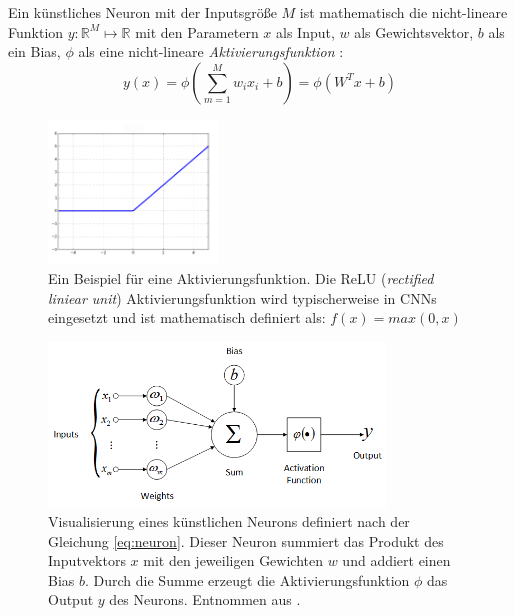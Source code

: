 Ein künstliches Neuron mit der Inputsgröße $M$ ist mathematisch die nicht-lineare Funktion $y : \mathbb{R}^M \mapsto \mathbb{R}$ mit den Parametern $x$ als Input, $w$ als Gewichtsvektor, $b$ als ein Bias, $\phi$ als eine nicht-lineare \textit{Aktivierungsfunktion} \cite{CS231nConvolutionalNeural}:
\begin{equation}
	\label{eq:neuron}
	y(x)=\phi\left(\sum_{m=1}^{M} w_{i} x_{i} + b\right) = \phi(W^Tx+b)
\end{equation}

\begin{figure}[h]
	\centering
	\includegraphics[width=0.4\textwidth]{images/ReLU.png}
	\caption{Ein Beispiel für eine Aktivierungsfunktion. Die ReLU (\textit{rectified liniear unit}) Aktivierungsfunktion wird typischerweise in CNNs eingesetzt und ist mathematisch definiert als: $f(x) = max(0,x)$ \cite{Goodfellow-et-al-2016} }
	\label{fig:relu}
\end{figure}

\begin{figure}[h]
	\centering
	\includegraphics[width=0.8\textwidth]{images/neuron.png}
	\caption{Visualisierung eines künstlichen Neurons definiert nach der Gleichung \ref{eq:neuron}. Dieser Neuron summiert das Produkt des Inputvektors $x$  mit den jeweiligen Gewichten $w$ und addiert einen Bias $b$. Durch die Summe erzeugt die Aktivierungsfunktion $\phi$ das Output $y$ des Neurons. Entnommen aus \cite{deoliveiraSystemBasedArtificial2017}. }
	\label{fig:neuron}
\end{figure}

